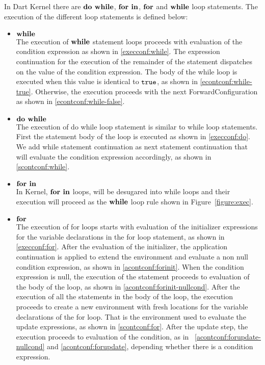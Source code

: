 \documentclass[a4paper,oneside]{article}
\newcommand{\synt}[1]{\ensuremath{\text{\textbf{#1}}}}
\DeclareMathOperator{\dowhile}{\synt{do~while}}
\DeclareMathOperator{\while}{\synt{while}}
\DeclareMathOperator{\forin}{\synt{for~in}}
\DeclareMathOperator{\for}{\synt{for}}
\begin{document}
In Dart Kernel there are $\dowhile$, $\forin$, $\for$ and $\while$ loop statements.
The execution of the different loop statements is defined below:

\begin{itemize}
    \item  $\while$\\
        The execution of  $\while$ statement loops proceeds with evaluation of the condition expression as shown in \eqref{execconf:while}.
        The expression continuation for the execution of the remainder of the statement dispatches on the value of the condition expression.
        The body of the while loop is executed when this value is identical to $\tt{true}$, as shown in \eqref{econtconf:while-true}.
        Otherwise, the execution proceeds with the next ForwardConfiguration as shown in \eqref{econtconf:while-false}.
    \item $\dowhile$\\
        The execution of do while loop statement is similar to while loop statements.
        First the statement body of the loop is executed as shown in \eqref{execconf:do}.
        We add while statement continuation as next statement continuation that will evaluate the condition expression accordingly, as shown in \eqref{scontconf:while}.
    \item $\forin$\\
        In Kernel, $\forin$ loops, will be desugared into while loops and their execution will proceed as the $\while$ loop rule shown in Figure~\ref{figure:exec}.
    \item $\for$\\
        The execution of for loops starts with evaluation of the initializer expressions for the variable declarations in the for loop statement, as shown in \eqref{execconf:for}.
        After the evaluation of the initializer, the application continuation is applied to extend the environment and evaluate a non null condition expression, as shown in \eqref{acontconf:forinit}.
        When the condition expression is null, the execution of the statement proceeds to evaluation of the body of the loop, as shown in \eqref{acontconf:forinit-nullcond}.
        After the execution of all the statements in the body of the loop, the execution proceeds to create a new environment with fresh locations for the variable declarations of the for loop.
        That is the environment used to evaluate the update expressions, as shown in \eqref{scontconf:for}.
        After the update step, the execution proceeds to evaluation of the condition, as in ~\eqref{acontconf:forupdate-nullcond} and \eqref{acontconf:forupdate}, depending whether there is a condition expression.
\end{itemize}
\end{document}
